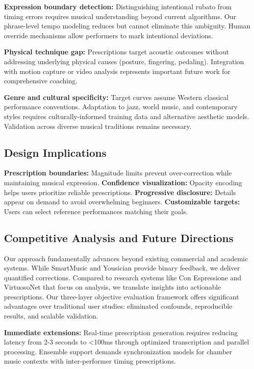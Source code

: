 \textbf{Expression boundary detection:} Distinguishing intentional rubato from timing errors requires musical understanding beyond current algorithms. Our phrase-level tempo modeling reduces but cannot eliminate this ambiguity. Human override mechanisms allow performers to mark intentional deviations.

\textbf{Physical technique gap:} Prescriptions target acoustic outcomes without addressing underlying physical causes (posture, fingering, pedaling). Integration with motion capture or video analysis represents important future work for comprehensive coaching.

\textbf{Genre and cultural specificity:} Target curves assume Western classical performance conventions. Adaptation to jazz, world music, and contemporary styles requires culturally-informed training data and alternative aesthetic models. Validation across diverse musical traditions remains necessary.

\subsection{Design Implications}
\textbf{Prescription boundaries:} Magnitude limits prevent over-correction while maintaining musical expression.
\textbf{Confidence visualization:} Opacity encoding helps users prioritize reliable prescriptions.
\textbf{Progressive disclosure:} Details appear on demand to avoid overwhelming beginners.
\textbf{Customizable targets:} Users can select reference performances matching their goals.

\subsection{Competitive Analysis and Future Directions}
Our approach fundamentally advances beyond existing commercial and academic systems. While SmartMusic and Yousician provide binary feedback, we deliver quantified corrections. Compared to research systems like Con Espressione and VirtuosoNet that focus on analysis, we translate insights into actionable prescriptions. Our three-layer objective evaluation framework offers significant advantages over traditional user studies: eliminated confounds, reproducible results, and scalable validation.

\textbf{Immediate extensions:} Real-time prescription generation requires reducing latency from 2-3 seconds to <100ms through optimized transcription and parallel processing. Ensemble support demands synchronization models for chamber music contexts with inter-performer timing prescriptions.

